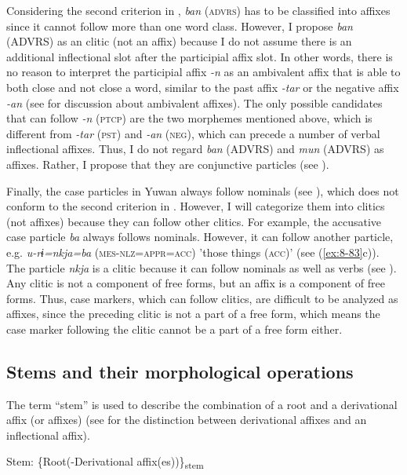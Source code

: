 Considering the second criterion in , \textit{ban} (\textsc{advrs}) has to be classified into affixes since it cannot follow more than one word class. However, I propose \textit{ban} (ADVRS) as an clitic (not an affix) because I do not assume there is an additional inflectional slot after the participial affix slot. In other words, there is no reason to interpret the participial affix \textit{{}-n} as an ambivalent affix that is able to both close and not close a word, similar to the past affix \textit{{}-tar} or the negative affix \textit{{}-an} (see  for discussion about ambivalent affixes). The only possible candidates that can follow \textit{{}-n} (\textsc{ptcp}) are the two morphemes mentioned above, which is different from \textit{{}-tar} (\textsc{pst}) and \textit{{}-an} (\textsc{neg}), which can precede a number of verbal inflectional affixes. Thus, I do not regard \textit{ban} (ADVRS) and \textit{mun} (ADVRS) as affixes. Rather, I propose that they are conjunctive particles (see ).

Finally, the case particles in Yuwan always follow nominals (see ), which does not conform to the second criterion in . However, I will categorize them into clitics (not affixes) because they can follow other clitics. For example, the accusative case particle \textit{ba} always follows nominals. However, it can follow another particle, e.g. \textit{u-rɨ=nkja=ba} (\textsc{mes-nlz=appr=acc}) 'those things (\textsc{acc})' (see (\ref{ex:8-83}c)). The particle \textit{nkja} is a clitic because it can follow nominals as well as verbs (see ). Any clitic is not a component of free forms, but an affix is a component of free forms. Thus, case markers, which can follow clitics, are difficult to be analyzed as affixes, since the preceding clitic is not a part of a free form, which means the case marker following the clitic cannot be a part of a free form either.

\subsection{Stems and their morphological operations}\label{sec:4.2.3}

The term “stem” is used to describe the combination of a root and a derivational affix (or affixes) (see  for the distinction between derivational affixes and an inflectional affix).

\ea  Stem: \{Root(-Derivational affix(es))\}\textsubscript{stem} \label{ex:4.21} \z

